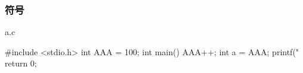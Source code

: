 \documentclass[UTF8,lualatex]{ctexbeamer}
\begin{document}

\begin{frame}[fragile,t]
    \frametitle{符号}
    \scriptsize
    \begin{exampleblock}{a.c}
        \begin{cppcode}
            #include <stdio.h>
            int AAA = 100;
            int main() {
                AAA++;
                int a = AAA;
                printf("%
                return 0;
            }
        \end{cppcode}
    \end{exampleblock}
    \begin{block}{~}
    \end{block}
\end{frame}

\end{document}
